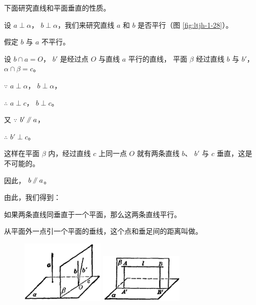 下面研究直线和平面垂直的性质。

设 $a \perp \alpha$， $b \perp \alpha$，我们来研究直线 $a$ 和 $b$ 是否平行（图 \ref{fig:ltjh-1-28}）。

假定 $b$ 与 $a$ 不平行。

设 $b \cap a = O$， $b'$ 是经过点 $O$ 与直线 $a$ 平行的直线，
平面 $\beta$ 经过直线 $b$ 与 $b'$， $\alpha \cap \beta = c$。

$\because$ \quad $a \perp \alpha$， $b \perp \alpha$，

$\therefore$ \quad $a \perp c$， $b \perp c$。

又 $\because$ \quad $b' \pingxing a$，

$\therefore$ \quad $b' \perp c$。

这样在平面 $\beta$ 内，经过直线 $c$ 上同一点 $O$ 就有两条直线
$b$、 $b'$ 与 $c$ 垂直，这是不可能的。

因此， $b \pingxing a$。

由此，我们得到：

\begin{dingli}[直线和平面垂直的性质定理][dl:zxhpmcz-xz]
    如果两条直线同垂直于一个平面，那么这两条直线平行。
\end{dingli}

从平面外一点引一个平面的垂线，这个点和垂足间的距离叫做。

\begin{figure}[htbp]
    \centering
    \begin{minipage}[b]{7cm}
        \centering
        \includegraphics[width=4cm]{../pic/ltjh-ch1-28.png}
        \caption{}\label{fig:ltjh-1-28}
    \end{minipage}
    \qquad
    \begin{minipage}[b]{7cm}
        \centering
        \includegraphics[width=4cm]{../pic/ltjh-ch1-29.png}
        \caption{}\label{fig:ltjh-1-29}
    \end{minipage}
\end{figure}

